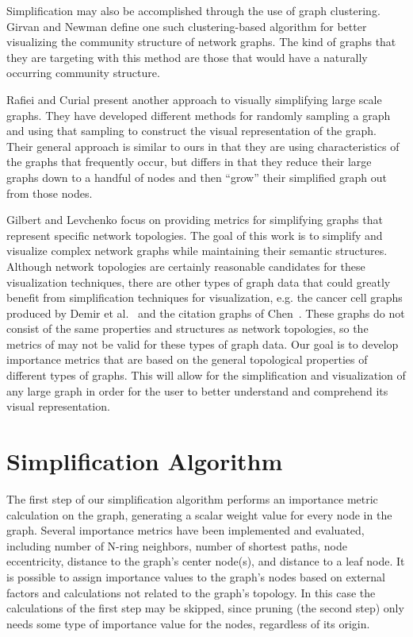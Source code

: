 Simplification may also be accomplished through the use of graph clustering.  Girvan and Newman \cite{Girvan-Newman02} define one such clustering-based algorithm for better visualizing the community structure of network graphs.  The kind of graphs that they are targeting with this method are those that would have a naturally occurring community structure.

Rafiei and Curial \cite{Rafiei-Curial05} present another approach to visually simplifying large scale graphs.  They have developed different methods for randomly sampling a graph and using that sampling to construct the visual representation of the graph.  Their general approach is similar to ours in that they are using characteristics of the graphs that frequently occur, but differs in that they reduce their large graphs down to a handful of nodes and then ``grow'' their simplified graph out from those nodes.

Gilbert and Levchenko \cite{Gilbert-Levchenko04} focus on providing metrics for simplifying graphs that represent specific network topologies.  The goal of this work is to simplify and visualize complex network graphs while maintaining their semantic structures.  Although network topologies are certainly reasonable candidates for these visualization techniques, there are other types of graph data that could greatly benefit from simplification techniques for visualization, e.g. the cancer cell graphs produced by Demir et al.~\cite{DemGulYen05} and the citation graphs of Chen~\cite{Chen06}.  These graphs do not consist of the same properties and structures as network topologies, so the metrics of \cite{Gilbert-Levchenko04} may not be valid for these types of graph data.  Our goal is to develop importance metrics that are based on the general topological properties of different types of graphs.  This will allow for the simplification and visualization of any large graph in order for the user to better understand and comprehend its visual representation.

\section{Simplification Algorithm}
\label{sect:SimpAlg}

The first step of our simplification algorithm performs an importance metric calculation on the graph, generating a scalar weight value for every node in the graph.  Several importance metrics have been implemented and evaluated, including number of N-ring neighbors, number of shortest paths, node eccentricity, distance to the graph's center node(s), and distance to a leaf node.  It is possible to assign importance values to the graph's nodes based on external factors and calculations not related to the graph's topology.  In this case the calculations of the first step may be skipped, since pruning (the second step) only needs some type of importance value for the nodes, regardless of its origin.


